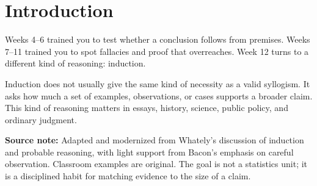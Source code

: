 \documentclass[12pt]{article}
\newcommand{\focusbox}[1]{\par\vspace{0.4em}\noindent\begingroup\setlength{\fboxsep}{6pt}\colorbox{gray!12}{\begin{minipage}{\dimexpr\linewidth-2\fboxsep\relax}#1\end{minipage}}\endgroup\par\vspace{0.5em}}
\begin{document}
\section*{Introduction}
Weeks 4--6 trained you to test whether a conclusion follows from premises. Weeks 7--11 trained you to spot fallacies and proof that overreaches. Week 12 turns to a different kind of reasoning: induction.

Induction does not usually give the same kind of necessity as a valid syllogism. It asks how much a set of examples, observations, or cases supports a broader claim. This kind of reasoning matters in essays, history, science, public policy, and ordinary judgment.

\focusbox{\textbf{Source note:} Adapted and modernized from Whately's discussion of induction and probable reasoning, with light support from Bacon's emphasis on careful observation. Classroom examples are original. The goal is not a statistics unit; it is a disciplined habit for matching evidence to the size of a claim.}
\end{document}
